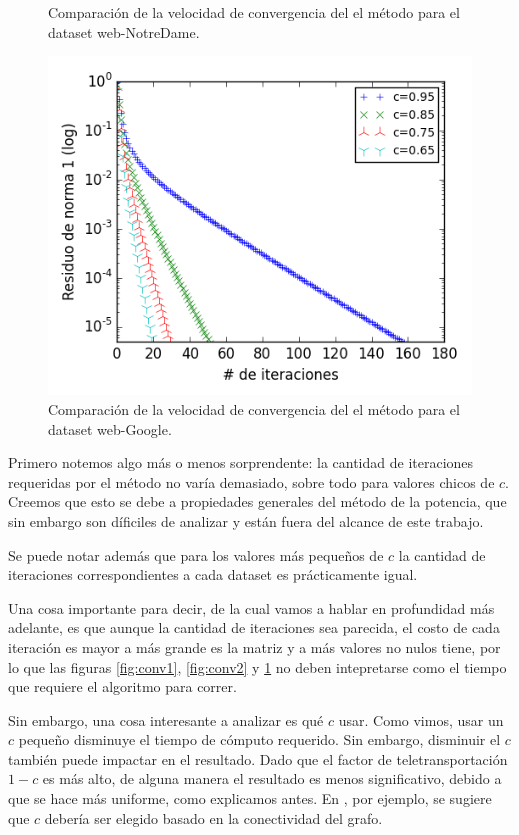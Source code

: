 \begin{figure}[H]
\begin{minipage}{0.48\textwidth}
  \caption{\footnotesize{Comparación de la velocidad de convergencia del el método para el dataset web-NotreDame.}}
  \label{fig:conv2}
\end{minipage}
\begin{minipage}{0.5\textwidth}
  \centering
    \includegraphics[width=1\textwidth]{imgs/convergencia-google.png}
  \caption{\footnotesize{Comparación de la velocidad de convergencia del el método para el dataset web-Google.}}
  \label{fig:conv3}
\end{minipage}
\end{figure}


Primero notemos algo más o menos sorprendente: la cantidad de iteraciones requeridas por el método no varía demasiado, sobre todo para valores chicos de $c$. Creemos que esto se debe a propiedades generales del método de la potencia, que sin embargo son díficiles de analizar y están fuera del alcance de este trabajo.

Se puede notar además que para los valores más pequeños de $c$ la cantidad de iteraciones correspondientes a cada dataset es prácticamente igual.

Una cosa importante para decir, de la cual vamos a hablar en profundidad más adelante, es que aunque la cantidad de iteraciones sea parecida, el costo de cada iteración es mayor a más grande es la matriz y a más valores no nulos tiene, por lo que las figuras \ref{fig:conv1}, \ref{fig:conv2} y \ref{fig:conv3} no deben intepretarse como el tiempo que requiere el algoritmo para correr.

Sin embargo, una cosa interesante a analizar es qué $c$ usar. Como vimos, usar un $c$ pequeño disminuye el tiempo de cómputo requerido. Sin embargo, disminuir el $c$ también puede impactar en el resultado. Dado que el factor de teletransportación $1-c$ es más alto, de alguna manera el resultado es menos significativo, debido a que se hace más uniforme, como explicamos antes. 
En \cite{Chakrabarti}, por ejemplo, se sugiere que $c$ debería ser elegido basado en la conectividad del grafo.

